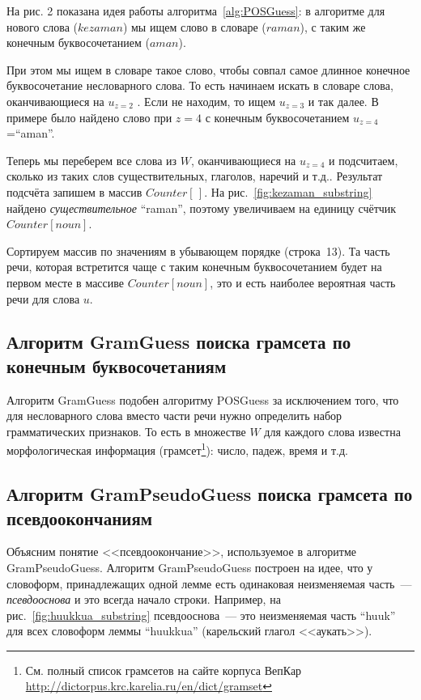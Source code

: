 
На рис. 2 показана идея работы алгоритма~\ref{alg:POSGuess}: в алгоритме для нового слова ($kezaman$) мы ищем слово в словаре ($raman$), с таким же конечным буквосочетанием ($aman$). 

При этом мы ищем в словаре такое слово, чтобы совпал самое длинное конечное буквосочетание несловарного слова. То есть начинаем искать в словаре слова, оканчивающиеся на $u_{z=2}$ . Если не находим, то ищем $u_{z=3}$ и так далее.
В примере было найдено слово при  $z=4$ с конечным буквосочетанием $u_{z=4}$=``aman''.

Теперь мы переберем все слова из $W$, оканчивающиеся на $u_{z=4}$ и подсчитаем, сколько из таких слов существительных, глаголов, наречий и т.д.. 
Результат подсчёта запишем в массив $Counter[\,]$. На рис.~\ref{fig:kezaman_substring} найдено \emph{существительное} ``raman'', поэтому увеличиваем на единицу счётчик $Counter[noun]$.

Сортируем массив по значениям в убывающем порядке (строка~13). Та часть речи, которая встретится чаще с таким конечным буквосочетанием будет на первом месте в массиве $Counter[noun]$, это и есть наиболее вероятная часть речи для слова $u$.


\subsection{Алгоритм GramGuess поиска грамсета по конечным буквосочетаниям}

Алгоритм GramGuess подобен алгоритму POSGuess за исключением того, что для несловарного слова вместо части речи нужно определить набор грамматических признаков.
То есть в множестве $W$ для каждого слова известна морфологическая информация (грамсет\footnote{См. полный список грамсетов на сайте корпуса ВепКар \url{http://dictorpus.krc.karelia.ru/en/dict/gramset}}): число, падеж, время и т.д.


\subsection{Алгоритм GramPseudoGuess поиска грамсета по псевдоокончаниям}

Объясним понятие <<псевдоокончание>>, используемое в алгоритме GramPseudoGuess.
Алгоритм GramPseudoGuess построен на идее, что у словоформ, принадлежащих одной лемме 
есть одинаковая неизменяемая часть~--- \emph{псевдооснова} и это всегда начало строки. 
Например, на рис.~\ref{fig:huukkua_substring} псевдооснова~--- это неизменяемая часть ``huuk'' 
для всех словоформ леммы ``huukkua'' (карельский глагол <<аукать>>).

